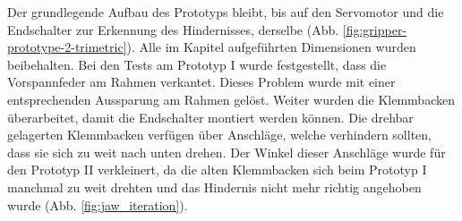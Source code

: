 Der grundlegende Aufbau des Prototyps bleibt, bis auf den Servomotor und die Endschalter zur Erkennung des Hindernisses, derselbe (Abb. \ref{fig:gripper-prototype-2-trimetric}). Alle im Kapitel  aufgeführten Dimensionen wurden beibehalten. Bei den Tests am Prototyp I wurde festgestellt, dass die Vorspannfeder am Rahmen verkantet. Dieses Problem wurde mit einer entsprechenden Aussparung am Rahmen gelöst. Weiter wurden die Klemmbacken überarbeitet, damit die Endschalter montiert werden können. Die drehbar gelagerten Klemmbacken verfügen über Anschläge, welche verhindern sollten, dass sie sich zu weit nach unten drehen. Der Winkel dieser Anschläge wurde für den Prototyp II verkleinert, da die alten Klemmbacken sich beim Prototyp I manchmal zu weit drehten und das Hindernis nicht mehr richtig angehoben wurde (Abb. \ref{fig:jaw_iteration}).

